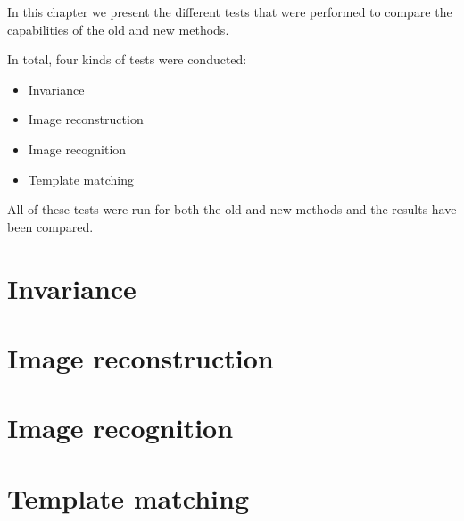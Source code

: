 In this chapter we present the different tests that were performed to compare the capabilities of the old and new methods.

In total, four kinds of tests were conducted:
\begin{itemize}
	\item Invariance
	\item Image reconstruction
	\item Image recognition
	\item Template matching
\end{itemize}
All of these tests were run for both the old and new methods and the results have been compared.

\section{Invariance}

\section{Image reconstruction}

\section{Image recognition}

\section{Template matching}
